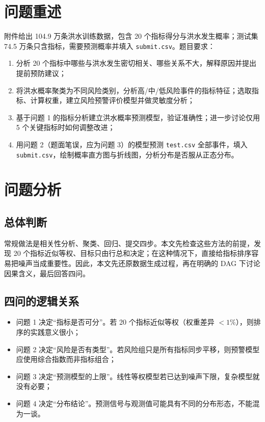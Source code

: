 \documentclass[12pt,a4paper]{ctexart}
\begin{document}
\newpage
\tableofcontents
\newpage

\section{问题重述}

附件给出 104.9 万条洪水训练数据，包含 20 个指标得分与洪水发生概率；测试集 74.5 万条只含指标，需要预测概率并填入 \texttt{submit.csv}。题目要求：

\begin{enumerate}[label=\textbf{问题 \arabic*}：]
  \item 分析 20 个指标中哪些与洪水发生密切相关、哪些关系不大，解释原因并提出提前预防建议；
  \item 将洪水概率聚类为不同风险类别，分析高/中/低风险事件的指标特征；选取指标、计算权重，建立风险预警评价模型并做灵敏度分析；
  \item 基于问题 1 的指标分析建立洪水概率预测模型，验证准确性；进一步讨论仅用 5 个关键指标时如何调整改进；
  \item 用问题 2（题面笔误，应为问题 3）的模型预测 \texttt{test.csv} 全部事件，填入 \texttt{submit.csv}，绘制概率直方图与折线图，分析分布是否服从正态分布。
\end{enumerate}

\section{问题分析}

\subsection{总体判断}
常规做法是相关性分析、聚类、回归、提交四步。本文先检查这些方法的前提，发现 20 个指标近似等权、目标只由行总和决定；在这种情况下，直接给指标排序容易把噪声当成重要性。因此，本文先还原数据生成过程，再在明确的 DAG 下讨论因果含义，最后回答四问。

\subsection{四问的逻辑关系}
\begin{itemize}
  \item 问题 1 决定“指标是否可分”。若 20 个指标近似等权（权重差异 $<1\%$），则排序的实践意义很小；
  \item 问题 2 决定“风险是否有类型”。若风险组只是所有指标同步平移，则预警模型应使用综合指数而非指标组合；
  \item 问题 3 决定“预测模型的上限”。线性等权模型若已达到噪声下限，复杂模型就没有必要；
  \item 问题 4 决定“分布结论”。预测信号与观测值可能具有不同的分布形态，不能混为一谈。
\end{itemize}
\end{document}

